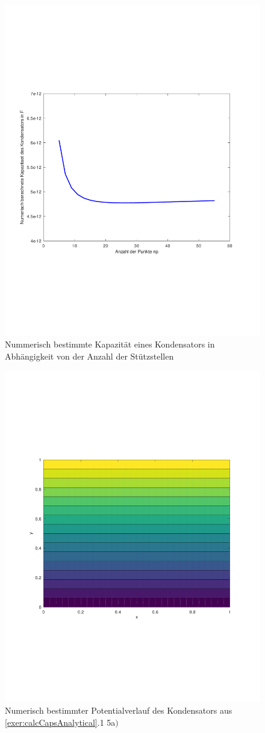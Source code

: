 \documentclass[Protokollheft.tex]{subfiles}
\begin{document}
\begin{figure}[h!]
	\centering
	\includegraphics[trim = 10mm 65mm 20mm 70mm, clip,width=0.7\linewidth]{KapazitaetUeberAnzStuetzstellen.pdf}
	\caption{Nummerisch bestimmte Kapazität eines Kondensators in Abhängigkeit von der Anzahl der Stützstellen}
	\label{fig:kapazitaetueberanzstuetzstellen}
\end{figure}

\begin{figure}[h!]
	\centering
	\includegraphics[trim = 20mm 70mm 20mm 70mm, clip,width=0.7\linewidth]{potential_A.pdf}
	\caption{Numerisch bestimmter Potentialverlauf des Kondensators aus \ref{exer:calcCapsAnalytical}.1 5a$)$}
	\label{fig:potA}
\end{figure}
\end{document}
